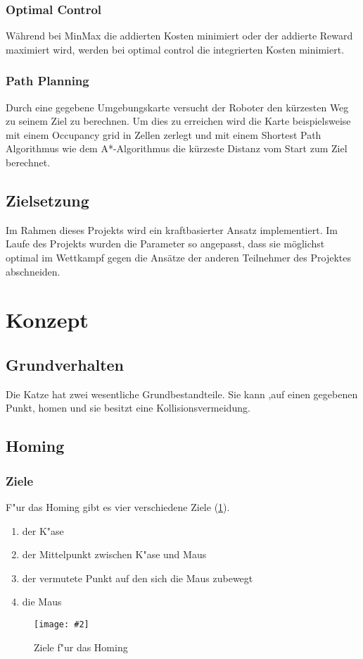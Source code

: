 \documentclass[
a4paper,     %
12pt         %
]{scrartcl}  %
\newcommand{\mygraphics}[3]{
\begin{figure}[!h]
  \begin{center}
    \texttt{[image: \#2]} \\
    \caption{#3}\label{fig:#2}
  \end{center}
\end{figure}

}
\begin{document}
\subsubsection{Optimal Control}
Während bei MinMax die addierten Kosten minimiert oder der addierte Reward maximiert wird, werden bei optimal control die integrierten Kosten minimiert.
\subsubsection{Path Planning}
Durch eine gegebene Umgebungskarte versucht der Roboter den kürzesten Weg zu seinem Ziel zu berechnen. Um dies zu erreichen wird die Karte beispielsweise mit einem Occupancy grid in Zellen zerlegt und mit einem Shortest Path Algorithmus wie dem A*-Algorithmus die kürzeste Distanz vom Start zum Ziel berechnet.  
\subsection{Zielsetzung}
Im Rahmen dieses Projekts wird ein kraftbasierter Ansatz implementiert. Im Laufe des Projekts wurden die Parameter so angepasst, dass sie möglichst optimal im Wettkampf gegen die Ansätze der anderen Teilnehmer des Projektes abschneiden.
\clearpage
\section{Konzept}
\subsection{Grundverhalten}
Die Katze hat zwei wesentliche Grundbestandteile. Sie kann ,auf einen gegebenen Punkt,  \glqq homen\grqq{} und sie besitzt eine Kollisionsvermeidung.
\subsection{Homing}
\subsubsection{Ziele}
F"ur das Homing gibt es vier verschiedene Ziele (\ref{fig:homingZiele.png}). 
\begin{enumerate}
\item der K"ase
\item der Mittelpunkt zwischen K"ase und Maus
\item der vermutete Punkt auf den sich die Maus zubewegt
\item die Maus
\end{enumerate}
\mygraphics{0.7\textwidth}{homingZiele.png}{Ziele f"ur das Homing}
\clearpage
\end{document}
